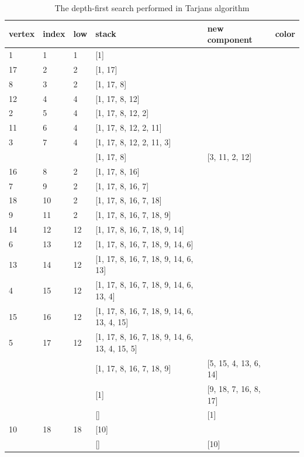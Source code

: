 \documentclass{l4proj}
\begin{document}
\begin{table}[H]
\centering
\begin{tabular}{|l|l|l|l|l|l|}
\hline
vertex & index & low & stack & new component & color \\
\hline
1& 1 & 1 & [1] & & \cellcolor{babyblue} \\
\hline
17& 2 & 2 & [1, 17] & & \cellcolor{yellow} \\
\hline
8& 3 & 2 & [1, 17, 8] & & \cellcolor{yellow} \\
\hline
12& 4 & 4 & [1, 17, 8, 12] & & \cellcolor{amber} \\
\hline
2& 5 & 4 & [1, 17, 8, 12, 2] & & \cellcolor{amber} \\
\hline
11& 6 & 4 & [1, 17, 8, 12, 2, 11] & & \cellcolor{amber} \\
\hline
3& 7 & 4 & [1, 17, 8, 12, 2, 11, 3] & & \cellcolor{amber} \\
\hline
& & & [1, 17, 8] & [3, 11, 2, 12] & \\
\hline
16& 8 & 2 & [1, 17, 8, 16] & & \cellcolor{yellow} \\
\hline
7& 9 & 2 & [1, 17, 8, 16, 7] & & \cellcolor{yellow} \\
\hline
18& 10 & 2 & [1, 17, 8, 16, 7, 18] & & \cellcolor{yellow} \\
\hline
9& 11 & 2 & [1, 17, 8, 16, 7, 18, 9] & & \cellcolor{yellow} \\
\hline
14& 12 & 12 & [1, 17, 8, 16, 7, 18, 9, 14] & & \cellcolor{applegreen} \\
\hline
6& 13 & 12 & [1, 17, 8, 16, 7, 18, 9, 14, 6] & & \cellcolor{applegreen} \\
\hline
13& 14 & 12 & [1, 17, 8, 16, 7, 18, 9, 14, 6, 13] & & \cellcolor{applegreen} \\
\hline
4& 15 & 12 & [1, 17, 8, 16, 7, 18, 9, 14, 6, 13, 4] & & \cellcolor{applegreen} \\
\hline
15& 16 & 12 & [1, 17, 8, 16, 7, 18, 9, 14, 6, 13, 4, 15] & & \cellcolor{applegreen} \\
\hline
5& 17 & 12 & [1, 17, 8, 16, 7, 18, 9, 14, 6, 13, 4, 15, 5] & & \cellcolor{applegreen} \\
\hline
& & & [1, 17, 8, 16, 7, 18, 9] & [5, 15, 4, 13, 6, 14] & \\
\hline
& & & [1] & [9, 18, 7, 16, 8, 17] & \\
\hline
& & & [] & [1] & \\
\hline
10& 18 & 18 & [10] & & \cellcolor{americanrose} \\
\hline
& & & [] & [10] & \\
\hline
\end{tabular}
\caption{The depth-first search performed in Tarjan\textquotesingle s algorithm \cite{tarjan1972depth}}
\label{tarjantable}
\end{table}
\end{document}
